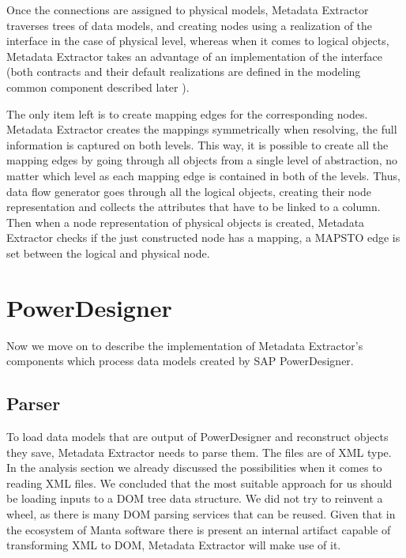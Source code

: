 Once the connections are assigned to physical models, Metadata Extractor traverses trees of data models, and creating nodes using a realization of the  interface in the case of physical level, whereas when it comes to logical objects, Metadata Extractor takes an advantage of an implementation of the  interface (both contracts and their default realizations are defined in the modeling common component described later ).

The only item left is to create mapping edges for the corresponding nodes.
Metadata Extractor creates the mappings symmetrically when resolving, the full information is captured on both levels. 
This way, it is possible to create all the mapping edges by going through all objects from a single level of abstraction, no matter which level as each mapping edge is contained in both of the levels.
Thus, data flow generator goes through all the logical objects, creating their node representation and collects the attributes that have to be linked to a column.
Then when a node representation of physical objects is created, Metadata Extractor checks if the just constructed node has a mapping, a MAPS\textunderscore TO edge is set between the logical and physical node.

\section{PowerDesigner}

Now we move on to describe the implementation of Metadata Extractor's components which process data models created by SAP PowerDesigner.

\subsection{Parser}

To load data models that are output of PowerDesigner and reconstruct objects they save, Metadata Extractor needs to parse them. The files are of XML type.
In the analysis section we already discussed the possibilities when it comes to reading XML files. We concluded that the most suitable approach for us should be loading inputs to a DOM tree data structure.
We did not try to reinvent a wheel, as there is many DOM parsing services that can be reused. 
Given that in the ecosystem of Manta software there is present an internal artifact capable of transforming XML to DOM, Metadata Extractor will make use of it.

